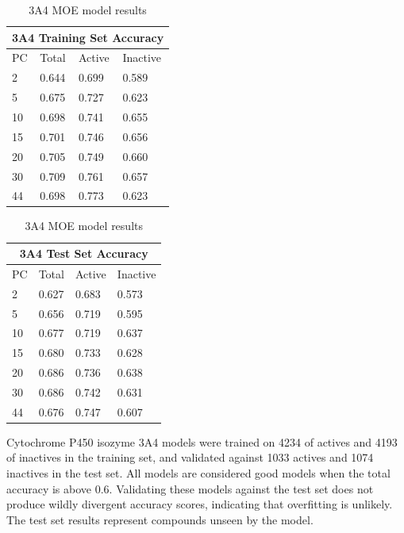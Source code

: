 \begin{table}[!h]
\begin{minipage}{.5\linewidth}
\centering
\begin{tabular}{|l|l|l|l|}
\hline
\multicolumn{4}{|c|}{3A4 Training Set Accuracy} \\ \hline
PC & Total          & Active          & Inactive \\ \hline
2  & 0.644          & 0.699           & 0.589   \\ \hline
5  & 0.675          & 0.727           & 0.623   \\ \hline
10 & 0.698          & 0.741           & 0.655   \\ \hline
15 & 0.701          & 0.746           & 0.656   \\ \hline
20 & 0.705          & 0.749           & 0.660   \\ \hline
30 & 0.709          & 0.761           & 0.657   \\ \hline
44 & 0.698          & 0.773           & 0.623   \\ \hline
\end{tabular}
\end{minipage}
\begin{minipage}{.5\linewidth}
\centering
\begin{tabular}{|l|l|l|l|}
\hline
\multicolumn{4}{|c|}{3A4 Test Set Accuracy}      \\ \hline
PC & Total          & Active          & Inactive \\ \hline
2  & 0.627          & 0.683           & 0.573    \\ \hline
5  & 0.656          & 0.719           & 0.595    \\ \hline
10 & 0.677          & 0.719           & 0.637    \\ \hline
15 & 0.680          & 0.733           & 0.628    \\ \hline
20 & 0.686          & 0.736           & 0.638    \\ \hline
30 & 0.686          & 0.742           & 0.631    \\ \hline
44 & 0.676          & 0.747           & 0.607    \\ \hline
\end{tabular}
\end{minipage}
\caption{3A4 MOE model results}
\end{table}

Cytochrome P450 isozyme 3A4 models were trained on 4234 of actives and 4193 of inactives in the training set, and validated against 1033 actives and 1074 inactives in the test set. All models are considered good models when the  total accuracy is above 0.6. Validating these models against the test set does not produce wildly divergent accuracy scores, indicating that overfitting is unlikely. The test set results represent compounds unseen by the model. 


